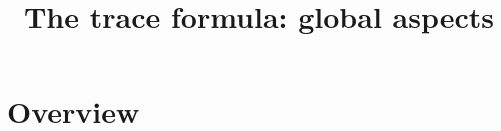 

%


\title{The trace formula: global aspects}


\maketitle

\label{section-phantom}


\tableofcontents


\section{Overview}
\label{section-overview}









